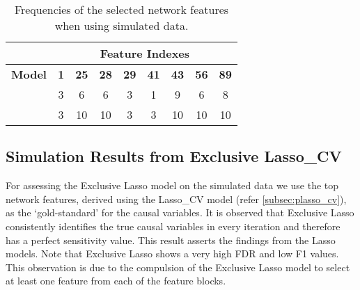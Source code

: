 \begin{table}[H]
\centering
\caption{Frequencies of the selected network features when using simulated data.}
\begin{tabular}{|c|c|c|c|c|c|c|c|c|}
\toprule
& \multicolumn{8}{c|}{\cellcolor[HTML]{D9E1F2}\textbf{Feature Indexes}} \\ 
\midrule
\cellcolor[HTML]{D9E1F2}\textbf{Model} & 
\cellcolor[HTML]{EAEAEA}\textbf{1} & \cellcolor[HTML]{EAEAEA}\textbf{25} & \cellcolor[HTML]{EAEAEA}\textbf{28} & \cellcolor[HTML]{EAEAEA}\textbf{29} & \cellcolor[HTML]{EAEAEA}\textbf{41} & \cellcolor[HTML]{EAEAEA}\textbf{43} & \cellcolor[HTML]{EAEAEA}\textbf{56} & \cellcolor[HTML]{EAEAEA}\textbf{89} \\ \hline
\cellcolor[HTML]{EAEAEA}{Lasso\_CV} & 
3 & 6 & 6 & 3 & 1 & 9 & 6 & 8\\ \hline
\cellcolor[HTML]{EAEAEA}{Plasso} &
3 & 10 & 10 & 3 & 3 & 10 & 10 & 10  \\ 
\bottomrule
\end{tabular}
\label{tab:lasso_selected_variables}
\end{table}

\subsection{Simulation Results from Exclusive Lasso\_CV} \label{subsec:simstudy_exclusvlasso}
For assessing the Exclusive Lasso model on the simulated data we use the top network features, derived using the Lasso\_CV model (refer \autoref{subsec:plasso_cv}), as the \lq gold-standard' for the causal variables. It is observed that Exclusive Lasso consistently identifies the true causal variables in every iteration and therefore has a perfect sensitivity value. This result asserts the findings from the Lasso models. Note that Exclusive Lasso shows a very high FDR and low F1 values. This observation is due to the compulsion of the Exclusive Lasso model to select at least one feature from each of the feature blocks. \\[4pt]
\begin{table}[H]
\caption{Performance measures of Exclusive Lasso when using variables from Lasso\_CV as reference.}
\label{tab:exclusv_lasso_sim_study}
\end{table}